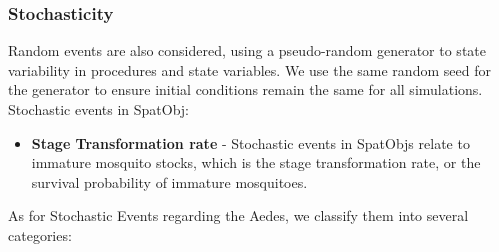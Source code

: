 \subsubsection{Stochasticity}
    Random events are also considered, using a pseudo-random generator to state variability in procedures and state variables. We use the same random seed for the generator to ensure initial conditions remain the same for all simulations.\\
Stochastic events in SpatObj:
\begin{itemize}

\item \textbf{Stage Transformation rate} - Stochastic events in SpatObjs relate to immature mosquito stocks, which is the stage transformation rate, or the survival probability of immature mosquitoes.\\

\end{itemize}
As for Stochastic Events regarding the Aedes, we classify them into several categories:
